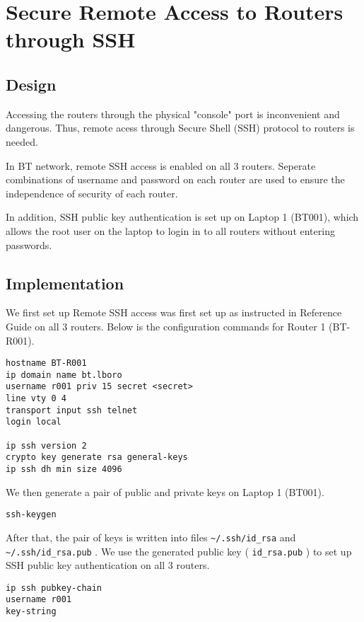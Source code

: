 \section{Secure Remote Access to Routers through SSH}
\label{sec:ssh}

\subsection{Design}

Accessing the routers through the physical "console" port is inconvenient and dangerous. Thus, remote acess through Secure Shell (SSH) protocol\citep{rfc4253} to routers is needed. 

In BT network, remote SSH access is enabled on all 3 routers. Seperate combinations of username and password on each router are used to ensure the independence of security of each router.

In addition, SSH public key authentication is set up on Laptop 1 (BT001), which allows the root user on the laptop to login in to all routers without entering passwords.

\subsection{Implementation}

We first set up Remote SSH access was first set up as instructed in Reference Guide on all 3 routers. Below is the configuration commands for Router 1 (BT-R001).

\begin{lstlisting}
hostname BT-R001
ip domain name bt.lboro
username r001 priv 15 secret <secret>
line vty 0 4
transport input ssh telnet
login local

ip ssh version 2
crypto key generate rsa general-keys
ip ssh dh min size 4096
\end{lstlisting}

We then generate a pair of public and private keys on Laptop 1 (BT001).

\begin{lstlisting}
ssh-keygen
\end{lstlisting}

After that, the pair of keys is written into files
\texttt{\textasciitilde{}/.ssh/id\_rsa} and
\texttt{\textasciitilde{}/.ssh/id\_rsa.pub} . We use the generated
public key ( \texttt{id\_rsa.pub} ) to set up SSH public key
authentication on all 3 routers.

\begin{lstlisting}
ip ssh pubkey-chain
username r001
key-string
\end{lstlisting}

